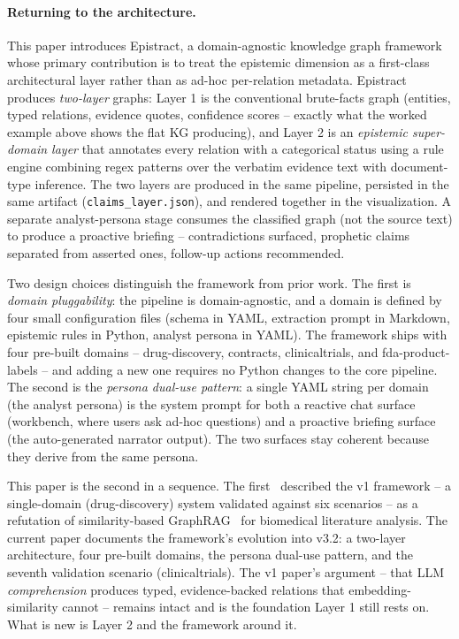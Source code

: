 \paragraph{Returning to the architecture.} This paper introduces Epistract, a domain-agnostic knowledge graph framework whose primary contribution is to treat the epistemic dimension as a first-class architectural layer rather than as ad-hoc per-relation metadata. Epistract produces \emph{two-layer} graphs: Layer 1 is the conventional brute-facts graph (entities, typed relations, evidence quotes, confidence scores -- exactly what the worked example above shows the flat KG producing), and Layer 2 is an \emph{epistemic super-domain layer} that annotates every relation with a categorical status using a rule engine combining regex patterns over the verbatim evidence text with document-type inference. The two layers are produced in the same pipeline, persisted in the same artifact (\texttt{claims\_layer.json}), and rendered together in the visualization. A separate analyst-persona stage consumes the classified graph (not the source text) to produce a proactive briefing -- contradictions surfaced, prophetic claims separated from asserted ones, follow-up actions recommended.

Two design choices distinguish the framework from prior work. The first is \emph{domain pluggability}: the pipeline is domain-agnostic, and a domain is defined by four small configuration files (schema in YAML, extraction prompt in Markdown, epistemic rules in Python, analyst persona in YAML). The framework ships with four pre-built domains -- drug-discovery, contracts, clinicaltrials, and fda-product-labels -- and adding a new one requires no Python changes to the core pipeline. The second is the \emph{persona dual-use pattern}: a single YAML string per domain (the analyst persona) is the system prompt for both a reactive chat surface (workbench, where users ask ad-hoc questions) and a proactive briefing surface (the auto-generated narrator output). The two surfaces stay coherent because they derive from the same persona.

This paper is the second in a sequence. The first~\cite{bhatt2026epistract_v1} described the v1 framework -- a single-domain (drug-discovery) system validated against six scenarios -- as a refutation of similarity-based GraphRAG~\cite{bhatt2025latentkg, edge2024graphrag} for biomedical literature analysis. The current paper documents the framework's evolution into v3.2: a two-layer architecture, four pre-built domains, the persona dual-use pattern, and the seventh validation scenario (clinicaltrials). The v1 paper's argument -- that LLM \emph{comprehension} produces typed, evidence-backed relations that embedding-similarity cannot -- remains intact and is the foundation Layer 1 still rests on. What is new is Layer 2 and the framework around it.

